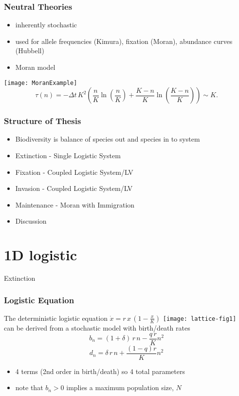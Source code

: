 \documentclass{beamer}
\begin{document}
\begin{frame}
\frametitle{Neutral Theories}
\begin{itemize}
	\item inherently stochastic
	\item used for allele frequencies (Kimura), fixation (Moran), abundance curves (Hubbell)
	\item Moran model
\end{itemize}
\centering
\texttt{[image: MoranExample]}
\begin{equation*}
\tau(n) = -\Delta t\,K^2\left(\frac{n}{K}\ln\left(\frac{n}{K}\right)+\frac{K-n}{K}\ln\left(\frac{K-n}{K}\right)\right) \sim K.
\end{equation*}
\end{frame}


\begin{frame}
\frametitle{Structure of Thesis}
\begin{itemize}
	\item Biodiversity is balance of species out and species in to system
	\pause
	\item Extinction - Single Logistic System
	\pause
	\item Fixation - Coupled Logistic System/LV
	\pause
	\item Invasion - Coupled Logistic System/LV
	\pause
	\item Maintenance - Moran with Immigration
	\pause
	\item Discussion
\end{itemize}
\end{frame}




\section[Extinction]{1D logistic}

\begin{frame}
\centering
{{\Huge Extinction}}
\end{frame}


\begin{frame}
\frametitle{Logistic Equation}
The deterministic logistic equation $\dot{x} = r \, x \, \left(1-\frac{x}{K}\right)$
\pause
\centering
\texttt{[image: lattice-fig1]} \\
can be derived from a stochastic model with birth/death rates
\begin{equation*}
b_n = (1 + \delta)\,r\,n - \frac{q\,r}{K}n^2%
\label{birth}
\end{equation*}
\begin{equation*}
d_n = \delta\,r\,n + \frac{(1-q)r}{K} n^2%
\label{death}
\end{equation*}
\pause
\begin{itemize}
\item 4 terms (2nd order in birth/death) so 4 total parameters
\item note that $b_n>0$ implies a maximum population size, $N$
\end{itemize}
\end{frame}
\end{document}
